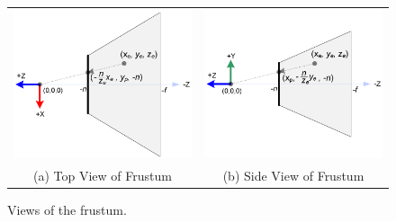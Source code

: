 \begin{figure}[h!]
\centering
\begin{tabular}{cc}
\includegraphics[width=0.45\linewidth,keepaspectratio=true]{figs/gl_projectionmatrix03.png}
&
\includegraphics[width=0.45\linewidth,keepaspectratio=true]{figs/gl_projectionmatrix04.png}
\\
(a) Top View of Frustum
&
(b) Side View of Frustum
\end{tabular}
\label{fig.frustum}
\caption{Views of the frustum.}
\end{figure}






